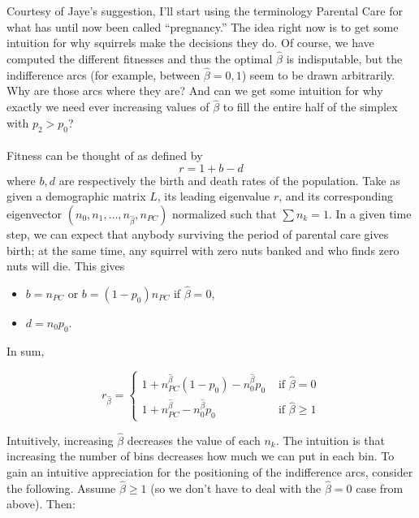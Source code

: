 Courtesy of Jaye's suggestion, I'll start using the terminology Parental Care for what has until now been called ``pregnancy.'' 
The idea right now is to get some intuition for why squirrels make the decisions they do. Of course, we have computed the different
fitnesses and thus the optimal $\hat \beta$ is indisputable, but the indifference arcs (for example, between $\hat \beta = 0, 1$) seem
to be drawn arbitrarily. Why are those arcs where they are? And can we get some intuition for why exactly we need ever increasing
values of $\hat \beta$ to fill the entire half of the simplex with $p_2 > p_0$?  \\ \\
Fitness can be thought of as defined by
$$ r = 1 + b - d $$
where $b,d$ are respectively the birth and death rates of the population. Take as given a demographic matrix $L$, its leading eigenvalue
$r$, and its corresponding eigenvector $\left( n_0, n_1, \ldots, n_{\hat \beta}, n_{PC} \right)$ normalized
such that $\sum n_k = 1$. In a given time step, we can expect that anybody surviving the period of parental care gives birth; at the same time,
any squirrel with zero nuts banked and who finds zero nuts will die. This gives
\begin{itemize}
    \item $b = n_{PC}$ or $b = (1 - p_0)n_{PC}$ if $\hat \beta = 0$,
    \item $d = n_0p_0$.
\end{itemize}
In sum,

$$ r_{\hat \beta} =
\begin{cases}
    1 + n_{PC}^{\hat \beta}\left( 1 - p_0 \right) - n_0^{\hat \beta}p_0 & \text{ if  } \hat \beta = 0 \\
    1 + n_{PC}^{\hat \beta} - n_0^{\hat \beta}p_0 & \text{ if  } \hat \beta \ge  1
\end{cases}
$$

Intuitively, increasing $\hat \beta$ decreases the value of each $n_k$. The intuition is that increasing the number
of bins decreases how much we can put in each bin. 
To gain an intuitive appreciation for the positioning of the indifference
arcs, consider the following. Assume $\hat \beta \ge 1$ (so we don't have to deal with the $\hat \beta = 0$ case from above). Then:

